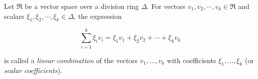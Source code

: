 Let $\mathfrak{R}$ be a vector space over a division ring $\Delta$. For vectors $v_1, v_2, \cdots, v_k \in \mathfrak{R}$ and scalars $\xi_1, \xi_2, \cdots, \xi_k \in \Delta$, the expression

$$\sum_{i=1}^{k} \xi_i v_i = \xi_1 v_1 + \xi_2 v_2 + \cdots + \xi_k v_k$$

is called a \emph{linear combination} of the vectors $v_1, \ldots, v_k$ with coefficients $\xi_1, \ldots, \xi_k$ (or \emph{scalar coefficients}).
